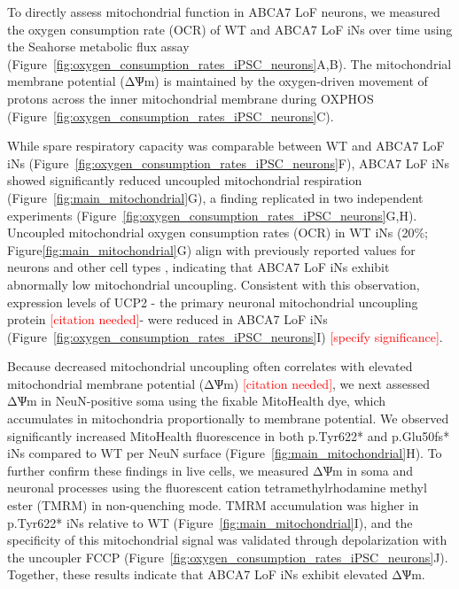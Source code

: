 To directly assess mitochondrial function in ABCA7 LoF neurons, we measured the oxygen consumption rate (OCR) of WT and ABCA7 LoF iNs over time using the Seahorse metabolic flux assay (Figure~\ref{fig:oxygen_consumption_rates_iPSC_neurons}A,B). The mitochondrial membrane potential (ΔѰm) is maintained by the oxygen-driven movement of protons across the inner mitochondrial membrane during OXPHOS (Figure~\ref{fig:oxygen_consumption_rates_iPSC_neurons}C). \newcommand{\quoteC}{\textcolor{blue}{Measuring OCR in the presence of mitochondrial inhibitors thus provides several functional readouts.Because OCR can be influenced by cell viability and mitochondrial abundance\cite{Divakaruni2014-eq,Gu2021-ms}, we report OCR ratios\cite{Divakaruni2022-rj} for WT, ABCA7 p.Glu50fs30, and ABCA7 p.Tyr622 iNs. First, we assessed spare respiratory capacity by measuring the relative increase in oxygen consumption following pharmacological collapse of the proton gradient\cite{Divakaruni2022-rj} (Figure~\ref{fig:oxygen_consumption_rates_iPSC_neurons}D). We then quantified the proportion of basal oxygen consumption attributed to ATP synthesis versus proton leak (i.e., uncoupled mitochondrial OCR)\cite{Divakaruni2014-eq} (Figure~\ref{fig:main_mitochondrial}E).\label{quoteC-label}}}

While spare respiratory capacity was comparable between WT and ABCA7 LoF iNs (Figure~\ref{fig:oxygen_consumption_rates_iPSC_neurons}F), ABCA7 LoF iNs showed significantly reduced uncoupled mitochondrial respiration (Figure~\ref{fig:main_mitochondrial}G), a finding replicated in two independent experiments (Figure~\ref{fig:oxygen_consumption_rates_iPSC_neurons}G,H). Uncoupled mitochondrial oxygen consumption rates (OCR) in WT iNs (20\%; Figure\ref{fig:main_mitochondrial}G) align with previously reported values for neurons and other cell types \cite{Divakaruni2011-uj,Jekabsons2004-fn}, indicating that ABCA7 LoF iNs exhibit abnormally low mitochondrial uncoupling. Consistent with this observation, expression levels of UCP2 - the primary neuronal mitochondrial uncoupling protein \textcolor{red}{[citation needed]}- were reduced in ABCA7 LoF iNs (Figure~\ref{fig:oxygen_consumption_rates_iPSC_neurons}I) \textcolor{red}{[specify significance]}. 

Because decreased mitochondrial uncoupling often correlates with elevated mitochondrial membrane potential (ΔѰm) \textcolor{red}{[citation needed]}, we next assessed ΔѰm in NeuN-positive soma using the fixable MitoHealth dye, which accumulates in mitochondria proportionally to membrane potential. We observed significantly increased MitoHealth fluorescence in both p.Tyr622* and p.Glu50fs* iNs compared to WT per NeuN surface (Figure~\ref{fig:main_mitochondrial}H). To further confirm these findings in live cells, we measured ΔѰm in soma and neuronal processes using the fluorescent cation tetramethylrhodamine methyl ester (TMRM) in non-quenching mode. TMRM accumulation was higher in p.Tyr622* iNs relative to WT (Figure~\ref{fig:main_mitochondrial}I), and the specificity of this mitochondrial signal was validated through depolarization with the uncoupler FCCP (Figure~\ref{fig:oxygen_consumption_rates_iPSC_neurons}J). Together, these results indicate that ABCA7 LoF iNs exhibit elevated ΔѰm. 

